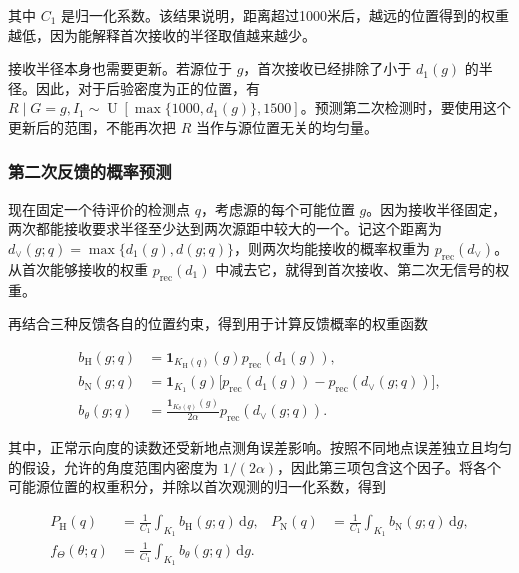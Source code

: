 \documentclass[UTF8,a4paper,zihao=-4,fontset=none]{ctexart}
\begin{document}
其中 \(C_1\) 是归一化系数。该结果说明，距离超过1000米后，越远的位置得到的权重越低，因为能解释首次接收的半径取值越来越少。

接收半径本身也需要更新。若源位于 \(g\)，首次接收已经排除了小于 \(d_1(g)\) 的半径。因此，对于后验密度为正的位置，有 \(R\mid G=g,I_1\sim\operatorname{U}[\max\{1000,d_1(g)\},1500]\)。预测第二次检测时，要使用这个更新后的范围，不能再次把 \(R\) 当作与源位置无关的均匀量。

\subsubsection{第二次反馈的概率预测}

现在固定一个待评价的检测点 \(q\)，考虑源的每个可能位置 \(g\)。因为接收半径固定，两次都能接收要求半径至少达到两次源距中较大的一个。记这个距离为 \(d_\vee(g;q)=\max\{d_1(g),d(g;q)\}\)，则两次均能接收的概率权重为 \(p_{\mathrm{rec}}(d_\vee)\)。从首次能够接收的权重 \(p_{\mathrm{rec}}(d_1)\) 中减去它，就得到首次接收、第二次无信号的权重。

再结合三种反馈各自的位置约束，得到用于计算反馈概率的权重函数

\begin{equation}
\begin{aligned}
 b_{\mathrm H}(g;q)&=\mathbf1_{K_{\mathrm H}(q)}(g)p_{\mathrm{rec}}(d_1(g)),\\
 b_{\mathrm N}(g;q)&=\mathbf1_{K_1}(g)\bigl[p_{\mathrm{rec}}(d_1(g))-p_{\mathrm{rec}}(d_\vee(g;q))\bigr],\\
 b_\theta(g;q)&=\frac{\mathbf1_{K_\theta(q)}(g)}{2\alpha}p_{\mathrm{rec}}(d_\vee(g;q)).
\end{aligned}
\label{eq:q2-pair-feedback-weights}
\end{equation}

其中，正常示向度的读数还受新地点测角误差影响。按照不同地点误差独立且均匀的假设，允许的角度范围内密度为 \(1/(2\alpha)\)，因此第三项包含这个因子。将各个可能源位置的权重积分，并除以首次观测的归一化系数，得到

\begin{equation}
\begin{aligned}
 P_{\mathrm H}(q)&=\frac{1}{C_1}\int_{K_1}b_{\mathrm H}(g;q)\,\mathrm dg,
 &P_{\mathrm N}(q)&=\frac{1}{C_1}\int_{K_1}b_{\mathrm N}(g;q)\,\mathrm dg,\\
 f_\Theta(\theta;q)&=\frac{1}{C_1}\int_{K_1}b_\theta(g;q)\,\mathrm dg.
\end{aligned}
\label{eq:q2-pair-prediction}
\end{equation}
\end{document}
